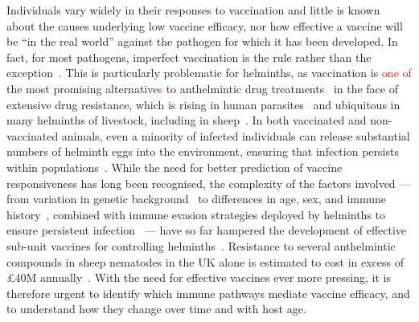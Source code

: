 \documentclass[a4paper, hidelinks, 11pt]{article}
\begin{document}
Individuals vary widely in their responses to vaccination and little is known
about the causes underlying low vaccine efficacy, nor how effective a vaccine
will be ``in the real world'' against the pathogen for which it has been
developed. In fact, for most pathogens, imperfect vaccination is the rule rather
than the exception~\supercite{Weinberg2010}. This is particularly problematic
for helminths, as vaccination is \textcolor{red}{one of} the most promising alternative\textcolor{red}{s} to anthelmintic
drug treatments~\supercite{Bartsch2016} in the face of extensive drug
resistance, which is rising in human parasites~\supercite{Campbell2016,
Doyle2017} and ubiquitous in many helminths of livestock, including in
sheep~\supercite{Redman2015, Doyle2018,RoseVineer2020}. In both vaccinated and
non-vaccinated animals, even a minority of infected individuals can release
substantial numbers of helminth eggs into the environment, ensuring that
infection persists within populations~\supercite{Lloyd-Smith2005}. While the
need for better prediction of vaccine responsiveness has long been recognised,
the complexity of the factors involved — from variation in genetic
background~\supercite{Beraldi2007a, Periasamy2014} to differences in age, sex,
and immune history~\supercite{Pedersen2011, Babayan2011}, combined with immune
evasion strategies deployed by helminths to ensure persistent
infection~\supercite{McNeilly2013, Finlay2014, Grencis2015} — have so far
hampered the development of effective sub-unit vaccines for controlling
helminths~\supercite{Babayan2012a}. Resistance to several anthelmintic compounds
in sheep nematodes in the UK alone is estimated to cost in excess of £40M
annually~\supercite{Charlier2020}. With the need for effective vaccines ever
more pressing, it is therefore urgent to identify which immune pathways mediate
vaccine efficacy, and to understand how they change over time and with host age.
\end{document}
